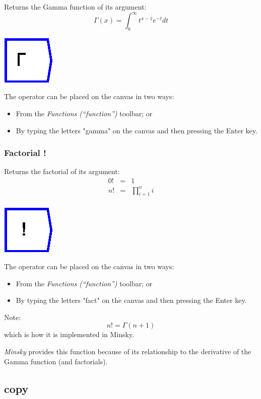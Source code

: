 \label{Operation:Gamma} Returns the Gamma function of its argument:
\[
\Gamma(x)=\int_{0}^{\infty}t^{x-1}e^{-t}dt
\]

\includegraphics{images/Gamma}

The operator can be placed on the canvas in two ways:
\begin{itemize}
\item From the \emph{Functions (``function'')} toolbar; or 
\item By typing the letters "gamma" on the canvas and then pressing the
Enter key.
\end{itemize}

\subsubsection{Factorial !}

\label{Operation:fact} Returns the factorial of its argument: 
\begin{eqnarray*}
0! & = & 1\\
n! & = & \prod_{i=1}^{n}i\\
\end{eqnarray*}

\includegraphics{images/Factorial}

The operator can be placed on the canvas in two ways:
\begin{itemize}
\item From the \emph{Functions (``function'')} toolbar; or 
\item By typing the letters "fact" on the canvas and then pressing the
Enter key.
\end{itemize}
Note: 
\[
n!=\Gamma(n+1)
\]
which is how it is implemented in Minsky.

\emph{Minsky} provides this function because of its relationship to
the derivative of the Gamma function (and factorials).

\subsection{copy}

